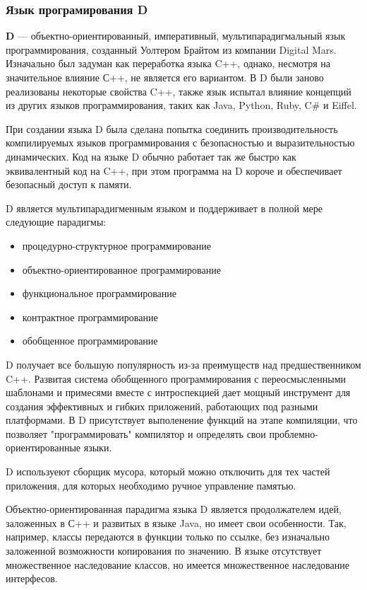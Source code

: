 \documentclass[russian,utf8,emptystyle]{eskdtext}
\begin{document}
\subsubsection{Язык програмирования D}
\textbf{D} — объектно-ориентированный, императивный, мультипарадигмальный язык программирования, созданный Уолтером Брайтом из компании Digital Mars. Изначально был задуман как переработка языка C++, однако, несмотря на значительное влияние С++, не является его вариантом. В D были заново реализованы некоторые свойства C++, также язык испытал влияние концепций из других языков программирования, таких как Java, Python, Ruby, C\# и Eiffel.

При создании языка D была сделана попытка соединить производительность компилируемых языков программирования с безопасностью и выразительностью динамических. Код на языке D обычно работает так же быстро как эквивалентный код на C++, при этом программа на D короче и обеспечивает безопасный доступ к памяти.

D является мультипарадигменным языком и поддерживает в полной мере следующие парадигмы:
\begin{itemize}
\item процедурно-структурное программирование
\item объектно-ориентированное программирование
\item функциональное программирование
\item контрактное программирование
\item обобщенное программирование
\end{itemize}

D получает все большую популярность из-за преимуществ над предшественником C++. Развитая система обобщенного программирования с переосмысленными шаблонами и примесями вместе с интроспекцией дает мощный инструмент для создания эффективных и гибких приложений, работающих под разными платформами. В D присутствует выполенение функций на этапе компиляции, что позволяет "программировать" компилятор и определять свои проблемно-ориентированные языки.

D используеют сборщик мусора, который можно отключить для тех частей приложения, для которых необходимо ручное управление памятью. 

Объектно-ориентированная парадигма языка D является продолжателем идей, заложенных в С++ и развитых в языке Java, но имеет свои особенности. Так, например, классы передаются в функции только по ссылке, без изначально заложенной возможности копирования по значению. В языке отсутствует множественное наследование классов, но имеется множественное наследование интерфесов.
\end{document}
